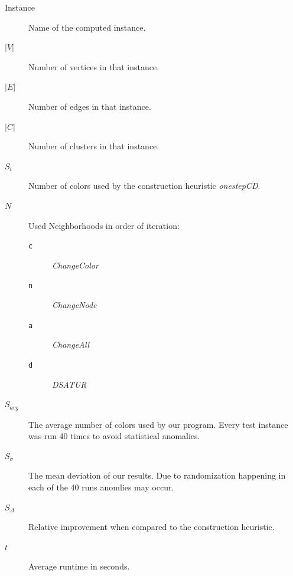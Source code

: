 \documentclass[paper=a4,fontsize=12pt]{scrartcl}
\begin{document}
\begin{description}
    \item[Instance] Name of the computed instance.
    \item[$|V|$] Number of vertices in that instance.
    \item[$|E|$] Number of edges in that instance.
    \item[$|C|$] Number of clusters in that instance.
    \item[$S_i$] Number of colors used by the construction heuristic \emph{onestepCD}.
    \item[$N$] Used Neighborhoods in order of iteration:
        \begin{description}
            \item[\texttt{c}] \emph{ChangeColor}
            \item[\texttt{n}] \emph{ChangeNode}
            \item[\texttt{a}] \emph{ChangeAll}
            \item[\texttt{d}] \emph{DSATUR}
        \end{description}
    \item[$S_{avg}$] The average number of colors used by our program. Every test instance was run 40 times to avoid statistical anomalies.
    \item[$S_{\sigma}$] The mean deviation of our results. Due to randomization happening in each of the 40 runs anomlies may occur.
    \item[$S_{\Delta}$] Relative improvement when compared to the construction heuristic.
    \item[$t$] Average runtime in seconds.
\end{description}
\end{document}
